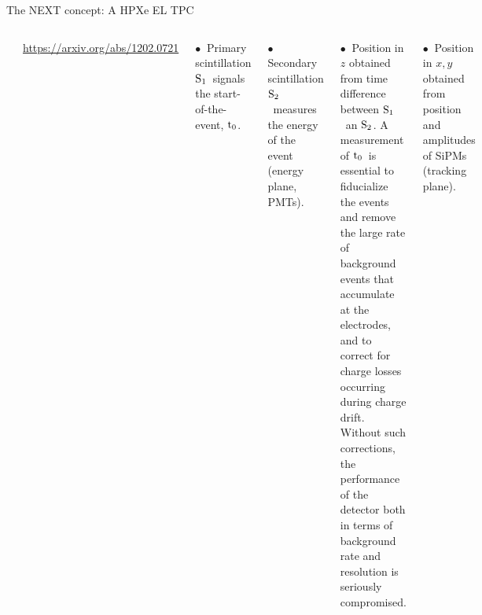 \documentclass [aspectratio=169]{beamer}
\newcommand{\so}{\ensuremath{\rm S_1}}
\newcommand{\st}{\ensuremath{\rm S_2}}
\newcommand{\tz}{\ensuremath{\rm t_0}}
\begin{document}
\begin{frame}{The NEXT concept: A HPXe EL TPC}

\begin{columns}
\includegraphics[scale=0.20]{nextpo.png}

\url{https://arxiv.org/abs/1202.0721}

$\bullet~$ Primary scintillation \so\ signals the start-of-the-event, \tz.

$\bullet~$ Secondary scintillation \st\  measures the energy of the event (energy plane, PMTs).

$\bullet~$ Position in $z$ obtained from time difference between \so\ an \st. A measurement of \tz\ is essential to fiducialize the events and remove the large rate of background events that accumulate at the electrodes, and to correct for charge losses occurring during charge drift. Without such corrections, the performance of the detector both in terms of background rate and resolution is seriously compromised.

 $\bullet~$ Position in $x,y$ obtained from position and amplitudes of SiPMs (tracking plane).
 \end{columns}
\end{frame}

\end{document}
